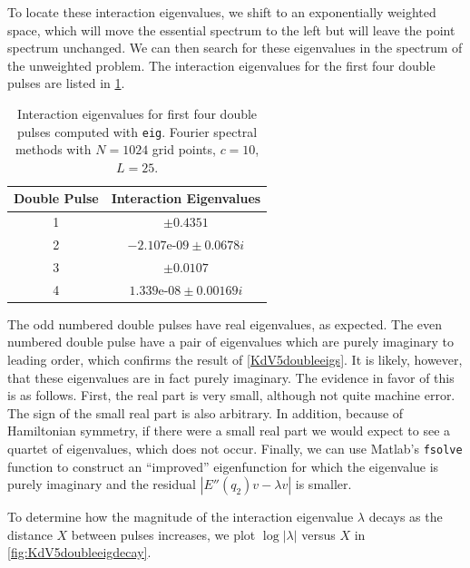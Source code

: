 \documentclass[thesis.tex]{subfiles}
\begin{document}
To locate these interaction eigenvalues, we shift to an exponentially weighted space, which will move the essential spectrum to the left but will leave the point spectrum unchanged. We can then search for these eigenvalues in the spectrum of the unweighted problem. The interaction eigenvalues for the first four double pulses are listed in \cref{table:KdV5inteigs}.

\begin{table}[H]
\centering
\begin{tabular}{|c|c|} 
 \hline
 Double Pulse & Interaction Eigenvalues \\
 \hline
 1 & $\pm 0.4351$ \\
 2 & $-2.107\text{e-}09 \pm 0.0678 i$ \\
 3 & $\pm 0.0107$ \\
 4 & $1.339\text{e-}08 \pm 0.00169 i$ \\
 \hline
\end{tabular}
\caption{Interaction eigenvalues for first four double pulses computed with \texttt{eig}. Fourier spectral methods with $N = 1024$ grid points, $c = 10$, $L = 25$.}
\label{table:KdV5inteigs}
\end{table}

The odd numbered double pulses have real eigenvalues, as expected. The even numbered double pulse have a pair of eigenvalues which are purely imaginary to leading order, which confirms the result of \cref{KdV5doubleeigs}. It is likely, however, that these eigenvalues are in fact purely imaginary. The evidence in favor of this is as follows. First, the real part is very small, although not quite machine error. The sign of the small real part is also arbitrary. In addition, because of Hamiltonian symmetry, if there were a small real part we would expect to see a quartet of eigenvalues, which does not occur. Finally, we can use Matlab's \texttt{fsolve} function to construct an ``improved'' eigenfunction for which the eigenvalue is purely imaginary and the residual $|E''(q_2)v - \lambda v|$ is smaller.

To determine how the magnitude of the interaction eigenvalue $\lambda$ decays as the distance $X$ between pulses increases, we plot $\log |\lambda|$ versus $X$ in \cref{fig:KdV5doubleeigdecay}. 
\end{document}
